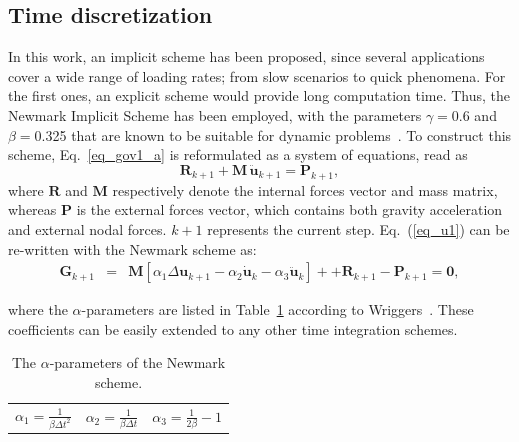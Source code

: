 \documentclass[applsci,journal,article,submit,moreauthors,pdftex]{Definitions/mdpi}
\begin{document}
  \subsection{Time discretization}
  In this work, an implicit scheme has been proposed, since several applications cover a wide range of loading rates; from slow scenarios to quick phenomena. For the first ones, an explicit scheme would provide long computation time. Thus, the Newmark Implicit Scheme has been employed, with the parameters $\gamma=$0.6 and $\beta=$0.325 that are known to be suitable for dynamic problems~\cite{Kontoe2006}. To construct this scheme, Eq.~\eqref{eq_gov1_a} is reformulated as a system of equations, read as
\begin{equation}\label{eq_u1}
 \boldsymbol{ R}_{k+1}  +   \boldsymbol{M}   \, \boldsymbol {\ddot{u}}_{k+1}= \boldsymbol{P }_{k+1},
\end{equation}
where   $\boldsymbol{R}$ and $  \boldsymbol{ M}$ respectively denote the internal forces vector and mass matrix, whereas $ \boldsymbol{P}$ is the external forces vector, which contains both gravity acceleration and external nodal forces. ${k+1}$ represents the current step. Eq.~(\ref{eq_u1}) can be re-written with the Newmark scheme as:
\begin{eqnarray}\label{eq_u2}
\boldsymbol {G}_{k+1} &=& \boldsymbol {M}\left[\alpha_1\Delta\boldsymbol {u}_{k+1}-\alpha_2\boldsymbol {\dot{u}}_{k}-\alpha_3\boldsymbol {\ddot{u}}_{k}\right] +
+ \boldsymbol {R}_{k+1}-\boldsymbol {P}_{k+1}=\boldsymbol {0},
\end{eqnarray}

where the $\alpha$-parameters are listed in Table~\ref{tab1} according to Wriggers~\cite{wriggers:08}. These coefficients can be easily extended to any other time integration schemes. 
\begin{table}
\caption{\label{tab1} The $\alpha$-parameters of the Newmark scheme.} 
\centering
	\begin{tabular}{lll}
	 $\alpha_1=\frac{1}{\beta\Delta t^2}$ & 	 $\alpha_2=\frac{1}{\beta\Delta t}$ & 
	 $\alpha_3=\frac{1}{2\beta}-1$
	\end{tabular}
\end{table}
\end{document}

